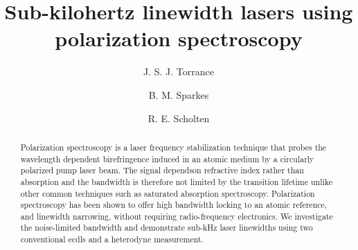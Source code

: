 \documentclass{article}
\begin{document}
\title{Sub-kilohertz linewidth lasers using polarization spectroscopy}
\author[1]{J. S. J. Torrance}
\author[1]{B. M. Sparkes}
\author[1]{R. E. Scholten}


\maketitle

\begin{abstract}
Polarization spectroscopy is a laser frequency stabilization technique that probes the wavelength dependent birefringence induced in an atomic medium by a circularly polarized pump laser beam. The signal dependson refractive index rather than absorption and the bandwidth is therefore not limited by the transition lifetime unlike other common techniques such as saturated absorption spectroscopy. Polarization spectroscopy has been shown to offer high bandwidth locking to an atomic reference, and linewidth narrowing, without requiring radio-frequency electronics. We investigate the noise-limited bandwidth and demonstrate sub-kHz laser linewidths using two conventional \glspl*{ecdl} and a heterodyne measurement.
\end{abstract}
\end{document}

